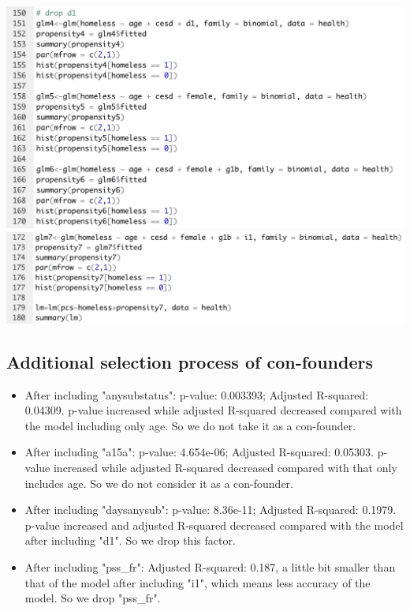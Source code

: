 \documentclass{report}
\begin{document}
\includegraphics[scale=0.3]{i.jpeg}\\
\includegraphics[scale=0.3]{j.jpeg}
\subsection{Additional selection process of con-founders}
\begin{itemize}
    \item After including "anysubstatus": p-value: 0.003393; Adjusted R-squared: 0.04309. p-value increased while adjusted R-squared decreased compared with the model including only age. So we do not take it as a con-founder.
    \item After including "a15a": p-value: 4.654e-06; Adjusted R-squared:  0.05303. p-value increased while adjusted R-squared decreased compared with that only includes age. So we do not consider it as a con-founder.
    \item After including "daysanysub": p-value: 8.36e-11; Adjusted R-squared: 0.1979. p-value increased and adjusted R-squared decreased compared with the model after including "d1". So we drop this factor.
    \item After including "pss\_fr": Adjusted R-squared: 0.187, a little bit smaller than that of the model after including "i1", which means less accuracy of the model. So we drop "pss\_fr".
\end{itemize}
\end{document}

